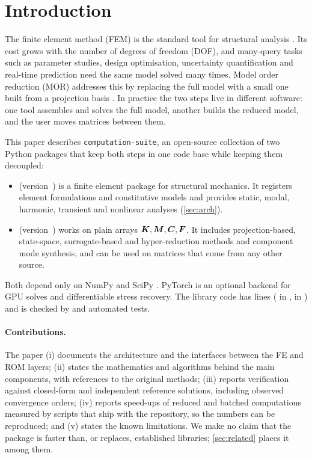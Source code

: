 \section{Introduction}\label{sec:intro}

The finite element method (FEM) is the standard tool for structural analysis \cite{zienkiewicz2013fem,bathe2014fep}.
Its cost grows with the number of degrees of freedom (DOF), and many-query tasks such as parameter studies, design
optimisation, uncertainty quantification and real-time prediction need the same model solved many times.
Model order reduction (MOR) addresses this by replacing the full model with a small one built from a projection basis
\cite{benner2015survey,hesthaven2016rb,antoulas2005}.
In practice the two steps live in different software: one tool assembles and solves the full model, another builds the
reduced model, and the user moves matrices between them.

This paper describes \texttt{computation-suite}, an open-source collection of two Python packages that keep both steps
in one code base while keeping them decoupled:

\begin{itemize}[leftmargin=*,itemsep=2pt]
  \item \fea{} (version~\feaVersion{}) is a finite element package for structural mechanics. It registers \nElements{}
  element formulations and \nConstitutive{} constitutive models and provides static, modal, harmonic, transient and
  nonlinear analyses (\cref{sec:arch}).
  \item \rom{} (version~\romVersion{}) works on plain arrays $\bm{K},\bm{M},\bm{C},\bm{F}$. It includes projection-based, state-space,
  surrogate-based and hyper-reduction methods and component mode synthesis, and can be used on matrices that come from any
  other source.
\end{itemize}

Both depend only on NumPy \cite{harris2020numpy} and SciPy \cite{virtanen2020scipy}. PyTorch \cite{paszke2019pytorch} is an optional
backend for GPU solves and differentiable stress recovery.
The library code has \totalLines{} lines (\feaLines{} in \fea{}, \romLines{} in \rom{}) and is checked by \feaTests{} and
\romTests{} automated tests.

\paragraph{Contributions.}
The paper (i) documents the architecture and the interfaces between the FE and ROM layers;
(ii) states the mathematics and algorithms behind the main components, with references to the original methods;
(iii) reports verification against closed-form and independent reference solutions, including observed convergence orders;
(iv) reports speed-ups of reduced and batched computations measured by scripts that ship with the repository, so the numbers
can be reproduced; and (v) states the known limitations. We make no claim that the package is faster than, or replaces,
established libraries; \cref{sec:related} places it among them.

